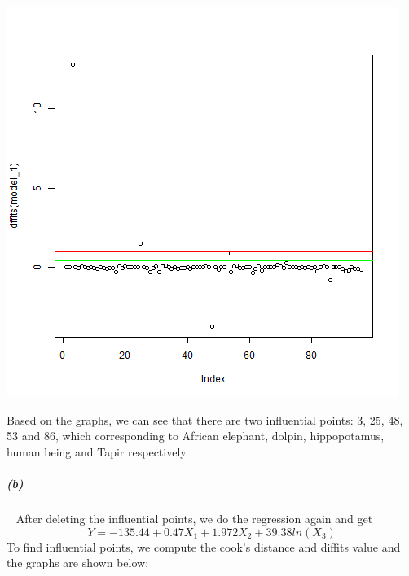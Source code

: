 \documentclass[12pt,a4paper]{article}
\begin{document}
\begin{center}
\includegraphics[scale=0.6]{3_a_3.png}
\end{center}
Based on the graphs, we can see that there are two influential points: 3, 25, 48, 53 and 86, which corresponding to African elephant, dolpin, hippopotamus, human being and Tapir respectively.
\subparagraph{(b)}~{}
After deleting the influential points, we do the regression again and get
\[Y = -135.44 + 0.47X_1 + 1.972X_2 + 39.38ln(X_3)\]
To find influential points, we compute the cook's distance and diffits value and the graphs are shown below:\\
\end{document}
